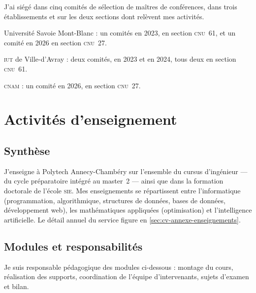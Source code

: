 
J'ai siégé dans cinq comités de sélection de maîtres de conférences, dans trois
établissements et sur les deux sections dont relèvent mes activités.

\begin{cvfields}
  \item[\textsc{listic}] Université Savoie Mont-Blanc : un comités en 2023,
    en section \textsc{cnu}~61, et un comité en 2026 en section
    \textsc{cnu}~27.
  \item[\textsc{leme}] \textsc{iut} de Ville-d'Avray : deux comités, en 2023
    et en 2024, tous deux en section \textsc{cnu}~61.
  \item[\textsc{cedric}] \textsc{cnam} : un comité en 2026, en section
    \textsc{cnu}~27.
\end{cvfields}


\section{Activités d'enseignement}
\label{sec:cv-enseignement}

\subsection{Synthèse}
\label{subsec:cv-enseignement-synthese}

J'enseigne à Polytech Annecy-Chambéry sur l'ensemble du cursus d'ingénieur ---
du cycle préparatoire intégré au master~2 --- ainsi que dans la formation
doctorale de l'école \textsc{sie}. Mes enseignements se répartissent entre
l'informatique (programmation, algorithmique, structures de données, bases de
données, développement web), les mathématiques appliquées (optimisation) et
l'intelligence artificielle. Le détail annuel du service figure en
\cref{sec:cv-annexe-enseignements}.


\subsection{Modules et responsabilités}
\label{subsec:cv-modules}

Je suis responsable pédagogique des modules ci-dessous : montage du cours,
réalisation des supports, coordination de l'équipe d'intervenants, sujets
d'examen et bilan.

